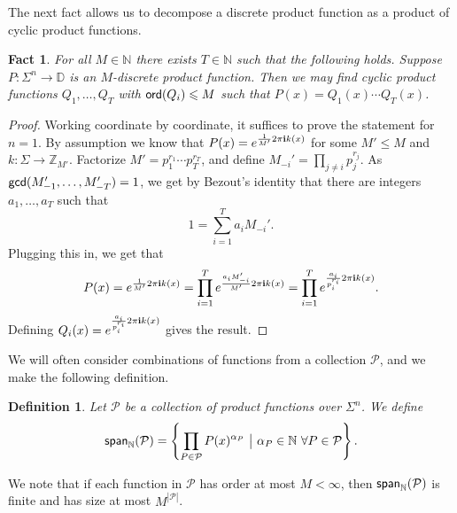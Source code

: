\documentclass[11pt]{article}
\newtheorem{fact}[thm]{Fact}
\newtheorem{definition}[thm]{Definition}
\newcommand\card[1]{\left| {#1} \right|}
\newcommand\spn{{\sf span}_{\mathbb{N}}}
\renewcommand\leq{\leqslant}
\begin{document}
The next fact allows us to decompose a discrete product function as a product of cyclic product functions.
\begin{fact}\label{fact:break_discrete_to_cyclic}
    For all $M\in\mathbb{N}$ there exists $T\in\mathbb{N}$ such that the following holds.
    Suppose $P\colon \Sigma^{n}\to\mathbb{D}$ is an $M$-discrete product function. Then we may find cyclic product functions $Q_1,\ldots,Q_T$ with ${\sf ord}(Q_i)\leq M$ such that $P(x) = Q_1(x)\cdots Q_T(x)$.
\end{fact}
\begin{proof}
    Working coordinate by coordinate, it suffices to prove the statement for $n=1$. By assumption we know that $P(x) = e^{\frac{1}{M'}2\pi{\bf i} k(x)}$ for some $M'\leq M$ and $k\colon \Sigma\to \mathbb{Z}_{M'}$. Factorize $M' = p_1^{r_1}\cdots p_T^{r_T}$, and define $M_{-i}' = \prod\limits_{j\neq i} p_j^{r_j}$. As ${\sf gcd}(M_{-1}',\ldots,M_{-T}') = 1$, we get by Bezout's identity that there are integers $a_1,\ldots,a_T$ such that
    \[
     1 = \sum\limits_{i=1}^{T} a_i M_{-i}'.
    \]
    Plugging this in, we get that
    \[
    P(x) = e^{\frac{1}{M'}2\pi{\bf i} k(x)}
    =
    \prod\limits_{i=1}^{T}
    e^{\frac{a_i M_{-i}'}{M'}2\pi{\bf i} k(x)}
    =\prod\limits_{i=1}^{T}
    e^{\frac{a_i}{p_i^{r_i}}2\pi{\bf i} k(x)}.
    \]
    Defining $Q_i(x) = e^{\frac{a_i}{p_i^{r_i}}2\pi{\bf i} k(x)}$ gives the result.
\end{proof}

We will often consider combinations of functions from a collection $\mathcal{P}$, and we make the following definition.
\begin{definition}
    Let $\mathcal{P}$ be a collection of product functions over $\Sigma^n$. We define
    \[
    \spn(\mathcal{P})
    =\left\{\prod\limits_{P\in\mathcal{P}}P(x)^{\alpha_{P}}~\big|~\alpha_P\in\mathbb{N}~\forall P\in\mathcal{P}\right\}.
    \]
\end{definition}
We note that if each function in $\mathcal{P}$ has order at most $M<\infty$, then $\spn(\mathcal{P})$ is finite and has size at most $M^{\card{\mathcal{P}}}$.
\end{document}
